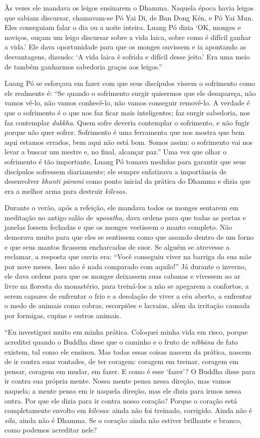Às vezes ele mandava os leigos ensinarem o Dhamma. Naquela época havia
leigos que sabiam discursar, chamavam-se Pó Yai Di, de Ban Dong Kén, e
Pó Yai Mun. Eles conseguiam falar o dia ou a noite inteira. Luang Pó
dizia `OK, monges e noviços, ouçam um leigo discursar sobre a vida
laica, sobre como é difícil ganhar a vida.' Ele dava oportunidade para
que os monges ouvissem e ia apontando as desvantagens, dizendo: `A vida
laica é sofrida e difícil desse jeito.' Era uma meio de também ganharmos
sabedoria graças aos leigos.''

Luang Pó se esforçava em fazer com que seus discípulos vissem o
sofrimento como ele realmente é: ``Se quando o sofrimento surgir
quisermos que ele desapareça, não vamos vê-lo, não vamos conhecê-lo, não
vamos conseguir removê-lo. A verdade é que o sofrimento é o que nos faz
ficar mais inteligentes; faz surgir sabedoria, nos faz contemplar
\emph{dukkha}. Quem sofre deveria contemplar o sofrimento, e não fugir
porque não quer sofrer. Sofrimento é uma ferramenta que nos mostra que
bem aqui estamos errados, bem aqui não está bom. Somos assim: o
sofrimento vai nos levar a buscar um mestre e, no final, alcançar paz.''
Uma vez que olhar o sofrimento é tão importante, Luang Pó tomava medidas
para garantir que seus discípulos sofressem diariamente; ele sempre
enfatizava a importância de desenvolver \emph{khanti pāramī} como ponto
inicial da prática do Dhamma e dizia que era a melhor arma para destruir
\emph{kilesas.}

Durante o verão, após a refeição, ele mandava todos os monges sentarem
em meditação no antigo salão de \emph{uposatha}, dava ordens para que
todas as portas e janelas fossem fechadas e que os monges vestissem o
manto completo. Não demorava muito para que eles se sentissem como que
assando dentro de um forno e que seus mantos ficassem encharcados de
suor. Se alguém se atrevesse a reclamar, a resposta que ouvia era:
``Você conseguiu viver na barriga da sua mãe por nove meses. Isso não é
nada comparado com aquilo!'' Já durante o inverno, ele dava ordens para
que os monges deixassem suas cabanas e vivessem ao ar livre na floresta
do monastério, para treiná-los a não se apegarem a confortos, a serem
capazes de enfrentar o frio e a desolação de viver a céu aberto, a
enfrentar o medo de animais como cobras, escorpiões e lacraias, além da
irritação causada por formigas, cupins e outros animais.

``Eu investiguei muito em minha prática. Coloquei minha vida em risco,
porque acreditei quando o Buddha disse que o caminho e o fruto de
\emph{nibbāna} de fato existem, tal como ele ensinou. Mas todas essas
coisas nascem da prática, nascem de ir contra suas vontades, de ter
coragem: coragem em treinar, coragem em pensar, coragem em mudar, em
fazer. E como é esse `fazer'? O Buddha disse para ir contra sua própria
mente. Nossa mente pensa nessa direção, mas vamos naquela; a mente pensa
em ir naquela direção, mas ele dizia para irmos nessa outra. Por que ele
dizia para ir contra nosso coração? Porque o coração está completamente
envolto em \emph{kilesas}: ainda não foi treinado, corrigido. Ainda não
é \emph{sīla,} ainda não é Dhamma. Se o coração ainda não estiver
brilhante e branco, como podemos acreditar nele?


